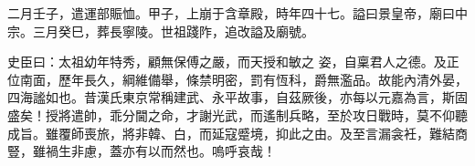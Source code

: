 \begin{pinyinscope}
 二月壬子，遣運部賑恤。甲子，上崩于含章殿，時年四十七。謚曰景皇帝，廟曰中宗。三月癸巳，葬長寧陵。世祖踐阼，追改謚及廟號。



 史臣曰：太祖幼年特秀，顧無保傅之嚴，而天授和敏之
 姿，自稟君人之德。及正位南面，歷年長久，綱維備舉，條禁明密，罰有恆科，爵無濫品。故能內清外晏，四海謐如也。昔漢氏東京常稱建武、永平故事，自茲厥後，亦每以元嘉為言，斯固盛矣！授將遣帥，乖分閫之命，才謝光武，而遙制兵略，至於攻日戰時，莫不仰聽成旨。雖覆師喪旅，將非韓、白，而延寇蹙境，抑此之由。及至言漏衾衽，難結商豎，雖禍生非慮，蓋亦有以而然也。嗚呼哀哉！



\end{pinyinscope}